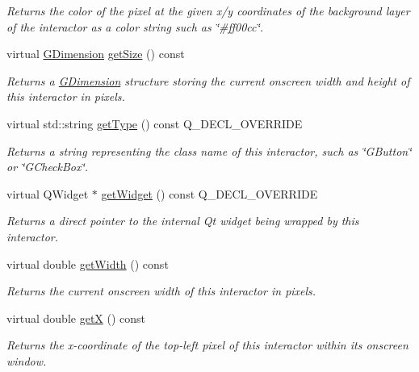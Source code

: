 \begin{DoxyCompactItemize}
\begin{DoxyCompactList}\small\item\em Returns the color of the pixel at the given x/y coordinates of the background layer of the interactor as a color string such as \char`\"{}\#ff00cc\char`\"{}. \end{DoxyCompactList}\item 
virtual \mbox{\hyperlink{classGDimension}{G\+Dimension}} \mbox{\hyperlink{classGInteractor_a7b4eec96a2bdc6420695d5796a78eea9}{get\+Size}} () const
\begin{DoxyCompactList}\small\item\em Returns a \mbox{\hyperlink{classGDimension}{G\+Dimension}} structure storing the current onscreen width and height of this interactor in pixels. \end{DoxyCompactList}\item 
virtual std\+::string \mbox{\hyperlink{classGCanvas_a9896d58fcfebbf1025aeeb5b8b9ede80}{get\+Type}} () const Q\+\_\+\+D\+E\+C\+L\+\_\+\+O\+V\+E\+R\+R\+I\+DE
\begin{DoxyCompactList}\small\item\em Returns a string representing the class name of this interactor, such as \char`\"{}\+G\+Button\char`\"{} or \char`\"{}\+G\+Check\+Box\char`\"{}. \end{DoxyCompactList}\item 
virtual Q\+Widget $\ast$ \mbox{\hyperlink{classGCanvas_a326ee51b5561f807df7b29a1c101f7fd}{get\+Widget}} () const Q\+\_\+\+D\+E\+C\+L\+\_\+\+O\+V\+E\+R\+R\+I\+DE
\begin{DoxyCompactList}\small\item\em Returns a direct pointer to the internal Qt widget being wrapped by this interactor. \end{DoxyCompactList}\item 
virtual double \mbox{\hyperlink{classGInteractor_a0ed2965abd4f5701d2cadf71239faf19}{get\+Width}} () const
\begin{DoxyCompactList}\small\item\em Returns the current onscreen width of this interactor in pixels. \end{DoxyCompactList}\item 
virtual double \mbox{\hyperlink{classGInteractor_a344385751bee0720059403940d57a13e}{getX}} () const
\begin{DoxyCompactList}\small\item\em Returns the x-\/coordinate of the top-\/left pixel of this interactor within its onscreen window. \end{DoxyCompactList}\item 

\end{DoxyCompactItemize}
